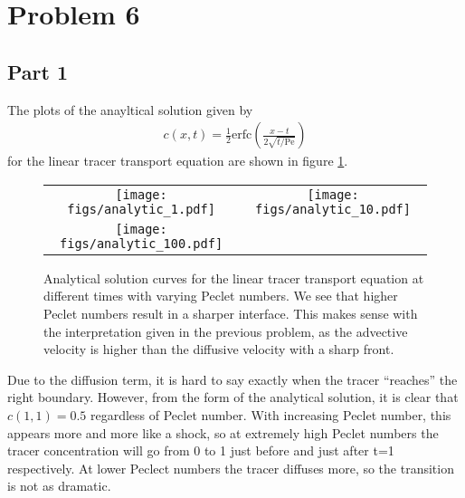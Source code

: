 \documentclass{article}
\begin{document}
\section{Problem 6}
\subsection{Part 1}
The plots of the anayltical solution given by
\begin{align}
    c(x,t) = \frac{1}{2} \mathrm{erfc} \left( \frac{x - t}{2 \sqrt{t / \mathrm{Pe}}} \right)
\end{align}
for the linear tracer transport equation are shown in figure \ref{fig:pe-analytical}.
\begin{figure}
\centering
\begin{tabular}{c c}
    \texttt{[image: figs/analytic\_1.pdf]} &
    \texttt{[image: figs/analytic\_10.pdf]} \\
    \texttt{[image: figs/analytic\_100.pdf]} &
    \\
\end{tabular}
\caption{Analytical solution curves for the linear tracer transport equation at different times with varying Peclet numbers. We see that higher Peclet numbers result in a sharper interface. This makes sense with the interpretation given in the previous problem, as the advective velocity is higher than the diffusive velocity with a sharp front.}
\label{fig:pe-analytical}
\end{figure}

Due to the diffusion term, it is hard to say exactly when the tracer ``reaches'' the right boundary.
However, from the form of the analytical solution, it is clear that $c(1,1) = 0.5$ regardless of Peclet number.
With increasing Peclet number, this appears more and more like a shock, so at extremely high Peclet numbers the tracer concentration will go from 0 to 1 just before and just after t=1 respectively.
At lower Peclect numbers the tracer diffuses more, so the transition is not as dramatic.
\end{document}
